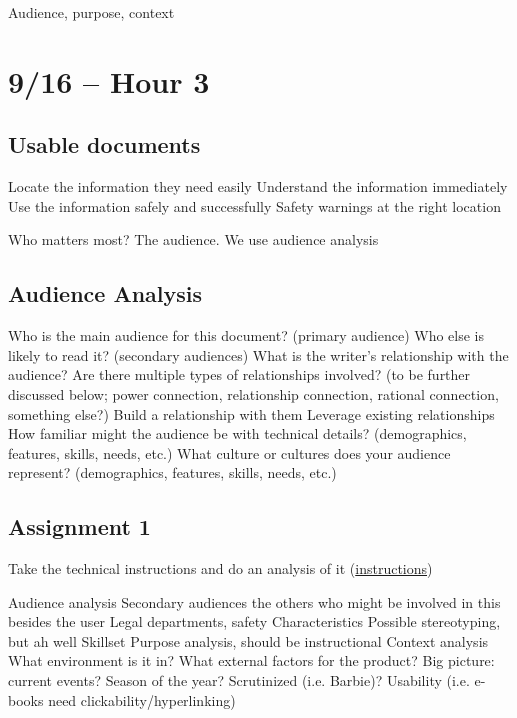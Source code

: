 Audience, purpose, context

\section{9/16 -- Hour 3}

\subsection{Usable documents}

\begin{outline}
    \1 Locate the information they need easily
    \1 Understand the information immediately
    \1 Use the information safely and successfully
        \2 Safety warnings at the right location
\end{outline}

Who matters most? The audience. We use audience analysis

\subsection{Audience Analysis}

\begin{outline}
    \1 Who is the main audience for this document? (primary audience)
    \1 Who else is likely to read it? (secondary audiences)
    \1 What is the writer's relationship with the audience? Are there multiple types of relationships involved? (to be further discussed below; power connection, relationship connection, rational connection, something else?)
        \2 Build a relationship with them
        \2 Leverage existing relationships
    \1 How familiar might the audience be with technical details? (demographics, features, skills, needs, etc.)
    \1 What culture or cultures does your audience represent? (demographics, features, skills, needs, etc.)
\end{outline}

\subsection{Assignment 1}

Take the technical instructions and do an analysis of it (\href{https://canvas.calpoly.edu/courses/26844/pages/class-1-dot-2-w-9-slash-16-hours-3-4?module_item_id=695646}{instructions})

\begin{outline}
    \1 Audience analysis 
        \2 Secondary audiences
            \3 the others who might be involved in this besides the user
            \3 Legal departments, safety 
        \2 Characteristics 
            \3 Possible stereotyping, but ah well
        \2 Skillset
    \1 Purpose analysis, should be instructional
    \1 Context analysis 
        \2 What environment is it in? What external factors for the product?
        \2 Big picture: current events? Season of the year?
        \2 Scrutinized (i.e. Barbie)?
        \2 Usability (i.e. e-books need clickability/hyperlinking)
\end{outline}

